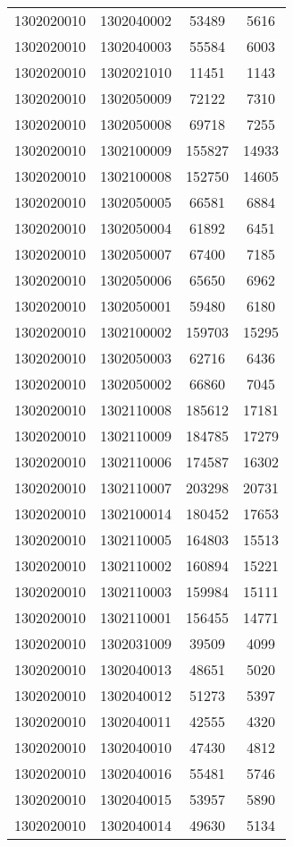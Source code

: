 \begin{longtable}[h]{llcc}
		1302020010 & 1302040002 & 53489 & 5616\\
		1302020010 & 1302040003 & 55584 & 6003\\
		1302020010 & 1302021010 & 11451 & 1143\\
		1302020010 & 1302050009 & 72122 & 7310\\
		1302020010 & 1302050008 & 69718 & 7255\\
		1302020010 & 1302100009 & 155827 & 14933\\
		1302020010 & 1302100008 & 152750 & 14605\\
		1302020010 & 1302050005 & 66581 & 6884\\
		1302020010 & 1302050004 & 61892 & 6451\\
		1302020010 & 1302050007 & 67400 & 7185\\
		1302020010 & 1302050006 & 65650 & 6962\\
		1302020010 & 1302050001 & 59480 & 6180\\
		1302020010 & 1302100002 & 159703 & 15295\\
		1302020010 & 1302050003 & 62716 & 6436\\
		1302020010 & 1302050002 & 66860 & 7045\\
		1302020010 & 1302110008 & 185612 & 17181\\
		1302020010 & 1302110009 & 184785 & 17279\\
		1302020010 & 1302110006 & 174587 & 16302\\
		1302020010 & 1302110007 & 203298 & 20731\\
		1302020010 & 1302100014 & 180452 & 17653\\
		1302020010 & 1302110005 & 164803 & 15513\\
		1302020010 & 1302110002 & 160894 & 15221\\
		1302020010 & 1302110003 & 159984 & 15111\\
		1302020010 & 1302110001 & 156455 & 14771\\
		1302020010 & 1302031009 & 39509 & 4099\\
		1302020010 & 1302040013 & 48651 & 5020\\
		1302020010 & 1302040012 & 51273 & 5397\\
		1302020010 & 1302040011 & 42555 & 4320\\
		1302020010 & 1302040010 & 47430 & 4812\\
		1302020010 & 1302040016 & 55481 & 5746\\
		1302020010 & 1302040015 & 53957 & 5890\\
		1302020010 & 1302040014 & 49630 & 5134\\

\end{longtable}
